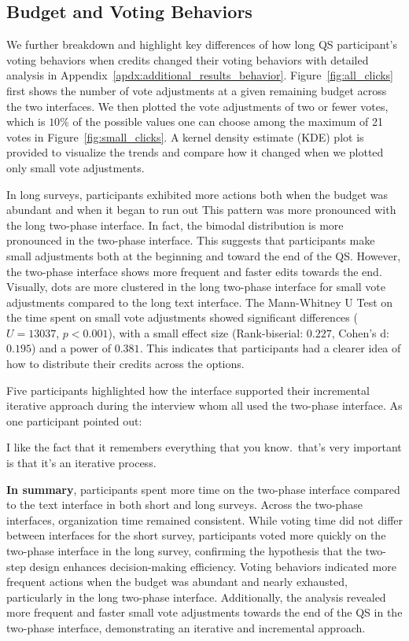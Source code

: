 \subsection{Budget and Voting Behaviors}
We further breakdown and highlight key differences of how long QS participant's voting behaviors when credits changed their voting behaviors with detailed analysis in Appendix~\ref{apdx:additional_results_behavior}. Figure~\ref{fig:all_clicks} first shows the number of vote adjustments at a given remaining budget across the two interfaces. We then plotted the vote adjustments of two or fewer votes, which is $10\%$ of the possible values one can choose among the maximum of 21 votes in Figure~\ref{fig:small_clicks}. A kernel density estimate (KDE) plot is provided to visualize the trends and compare how it changed when we plotted only small vote adjustments.

In long surveys, participants exhibited more actions both when the budget was abundant and when it began to run out This pattern was more pronounced with the long two-phase interface. In fact, the bimodal distribution is more pronounced in the two-phase interface. This suggests that participants make small adjustments both at the beginning and toward the end of the QS. However, the two-phase interface shows more frequent and faster edits towards the end. Visually, dots are more clustered in the long two-phase interface for small vote adjustments compared to the long text interface. The Mann-Whitney U Test on the time spent on small vote adjustments showed significant differences ($U=13037$, $p<0.001$), with a small effect size (Rank-biserial: $0.227$, Cohen's d: $0.195$) and a power of $0.381$. This indicates that participants had a clearer idea of how to distribute their credits across the options.

Five participants highlighted how the interface supported their incremental iterative approach during the interview whom all used the two-phase interface. As one participant pointed out:

\begin{displayquote}
I like the fact that it remembers everything that you know.~\bracketellipsis that's very important is that it's an iterative process.\hfill{}
\end{displayquote}

\textbf{In summary}, participants spent more time on the two-phase interface compared to the text interface in both short and long surveys. Across the two-phase interfaces, organization time remained consistent. While voting time did not differ between interfaces for the short survey, participants voted more quickly on the two-phase interface in the long survey, confirming the hypothesis that the two-step design enhances decision-making efficiency. Voting behaviors indicated more frequent actions when the budget was abundant and nearly exhausted, particularly in the long two-phase interface. Additionally, the analysis revealed more frequent and faster small vote adjustments towards the end of the QS in the two-phase interface, demonstrating an iterative and incremental approach. 

